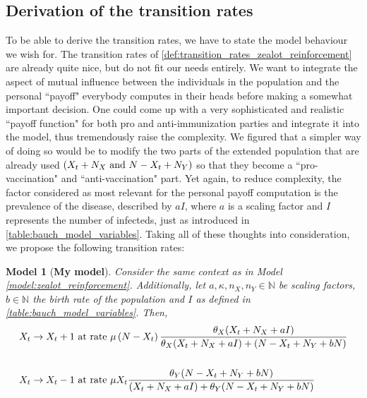 \documentclass[12pt,a4paper,twoside]{article}
\newtheorem{model}{Model}[section]
\begin{document}
\subsection{Derivation of the transition rates}
To be able to derive the transition rates, we have to state the model behaviour we wish for. The transition rates of \eqref{def:transition_rates_zealot_reinforcement} are already quite nice, but do not fit our needs entirely. We want to integrate the aspect of mutual influence between the individuals in the population and the personal ``payoff" everybody computes in their heads before making a somewhat important decision. One could come up with a very sophisticated and realistic ``payoff function" for both pro and anti-immunization parties and integrate it into the model, thus tremendously raise the complexity. We figured that a simpler way of doing so would be to modify the two parts of the extended population that are already used $\left(X_t + N_X\textnormal{ and }N- X_t + N_Y\right)$ so that they become a ``pro-vaccination" and ``anti-vaccination" part. Yet again, to reduce complexity, the factor considered as most relevant for the personal payoff computation is the prevalence of the disease, described by $aI$, where $a$ is a scaling factor and $I$ represents the number of infecteds, just as introduced in \eqref{table:bauch_model_variables}. %
Taking all of these thoughts into consideration, we propose the following transition rates:
\begin{model}[\textbf{My model}]
	Consider the same context as in Model \ref{model:zealot_reinforcement}. Additionally, let $a,\kappa, n_X, n_Y \in \mathbb{N}$ be scaling factors, $b \in \mathbb{N}$ the birth rate of the population and $I$ as defined in \eqref{table:bauch_model_variables}. Then,
\begin{align}\label{def:transition_rates_my_model}
\begin{split}
X_t \rightarrow X_t + 1 & \textnormal{ at rate } \mu\left(N-X_t\right)\frac{\theta_X (X_t + N_X + aI)}{\theta_X (X_t + N_X + aI) + (N-X_t + N_Y + bN)} \\
&\\
X_t \rightarrow X_t - 1 & \textnormal{ at rate } \mu X_t\frac{\theta_Y(N-X_t+N_Y + bN)}{(X_t + N_X+aI) + \theta_Y(N-X_t+N_Y + bN)}
\end{split}
\end{align}
\end{model}
\end{document}
